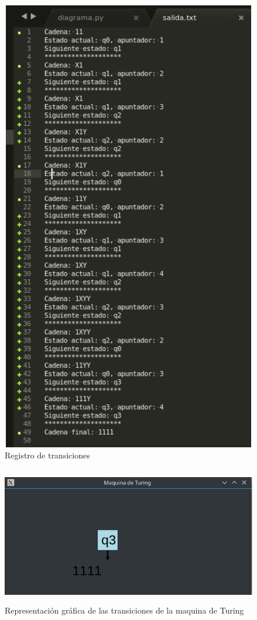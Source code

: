 \begin{figure}[H]
\begin{center}
 \includegraphics[width=13cm, height=20cm]{./img/dos_historial.png}
 \caption{Registro de transiciones}
 \label{fig:dos_historial}
\end{center}
\end{figure}

\begin{figure}[H]
\begin{center}
 \includegraphics[width=13cm, height=6cm]{./img/dos_grafica.png}
 \caption{Representación gráfica de las transiciones de la maquina de Turing}
 \label{fig:dos_grafica}
\end{center}
\end{figure}

